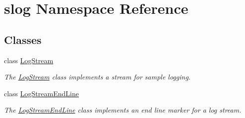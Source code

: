 \hypertarget{namespaceslog}{}\section{slog Namespace Reference}
\label{namespaceslog}
\subsection*{Classes}
\begin{DoxyCompactItemize}
\item 
class \hyperlink{classslog_1_1LogStream}{Log\+Stream}
\begin{DoxyCompactList}\small\item\em The \hyperlink{classslog_1_1LogStream}{Log\+Stream} class implements a stream for sample logging. \end{DoxyCompactList}\item 
class \hyperlink{classslog_1_1LogStreamEndLine}{Log\+Stream\+End\+Line}
\begin{DoxyCompactList}\small\item\em The \hyperlink{classslog_1_1LogStreamEndLine}{Log\+Stream\+End\+Line} class implements an end line marker for a log stream. \end{DoxyCompactList}\end{DoxyCompactItemize}
